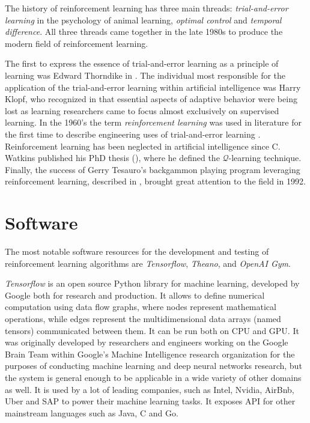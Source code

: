 The history of reinforcement learning has three main threads: \textit{trial-and-error learning} in the psychology of animal learning, \textit{optimal control} and \textit{temporal difference}.
All three threads came together in the late 1980s to produce the modern field of reinforcement learning.

The first to express the essence of trial-and-error learning as a
principle of learning was Edward Thorndike in \cite{thorndike1911animal}.
%
The individual most responsible for the application of the trial-and-error learning within artificial intelligence was Harry Klopf, who recognized in \cite{klopf1972brain} that essential aspects of adaptive behavior were being lost as learning researchers came to focus almost exclusively on supervised learning.
%
In the 1960's the term \textit{reinforcement learning} was used in literature for the first time to describe engineering uses of trial-and-error learning \cite{waltz1965heuristic}.
%
Reinforcement learning has been neglected in artificial intelligence since C. Watkins published his PhD thesis (\cite{watkins1989learning}), where he defined the $\mathcal{Q}$-learning technique.
%
Finally, the success of Gerry Tesauro's backgammon playing program leveraging reinforcement learning, described in \cite{tesauro1995temporal}, brought great attention to the field in 1992.


\section{Software}
\label{sec:reinforcement-learning-software}
The most notable software resources for the development and testing of reinforcement learning algorithms are \textit{Tensorflow}, \textit{Theano}, and \textit{OpenAI Gym}.

\textit{Tensorflow} is an open source Python library for machine learning, developed by Google both for research and production.
%
It allows to define numerical computation using data flow graphs, where nodes represent mathematical operations, while edges represent the multidimensional data arrays (named tensors) communicated between them.
%
It can be run both on CPU and GPU.
%
It was originally developed by researchers and engineers working on the Google Brain Team within Google's Machine Intelligence research organization for the purposes of conducting machine learning and deep neural networks research, but the system is general enough to be applicable in a wide variety of other domains as well.
%
It is used by a lot of leading companies, such as Intel, Nvidia, AirBnb, Uber and SAP to power their machine learning tasks.
%
It exposes API for other mainstream languages such as Java, C and Go.

